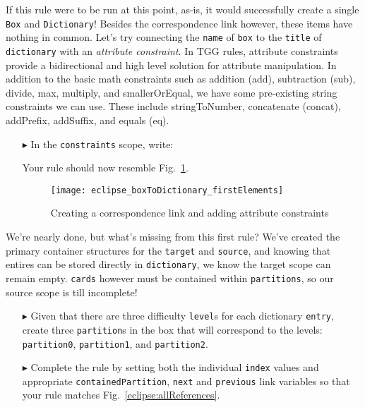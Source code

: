 If this rule were to be run at this point, as-is, it would successfully create a single \texttt{Box} and \texttt{Dictionary}! Besides the correspondence link
however, these items have nothing in common. Let's try connecting the \texttt{name} of \texttt{box} to the \texttt{title} of \texttt{dictionary} with an
\emph{attribute constraint}. In TGG rules, attribute constraints provide a bidirectional and high level solution for attribute manipulation. In addition to the
basic math constraints such as addition (add), subtraction (sub), divide, max, multiply, and smallerOrEqual, we have some pre-existing string constraints we can
use. These include stringToNumber, concatenate (concat), addPrefix, addSuffix, and equals (eq).

\begin{itemize}

\item[$\blacktriangleright$] In the \texttt{constraints} scope, write:


Your rule should now resemble Fig.~\ref{eclipse:ruleBasic}.

\vspace{0.5cm}

\begin{figure}[htbp]
\begin{center}
  \texttt{[image: eclipse\_boxToDictionary\_firstElements]}
  \caption{Creating a correspondence link and adding attribute constraints}
  \label{eclipse:ruleBasic}
\end{center}
\end{figure}

\end{itemize}

We're nearly done, but what's missing from this first rule? We've created the primary container structures for the \texttt{target} and \texttt{source}, and
knowing that entires can be stored directly in \texttt{dictionary}, we know the target scope can remain empty. \texttt{cards} however must be contained within
\texttt{partitions}, so our source scope is till incomplete!

\begin{itemize}

\item[$\blacktriangleright$] Given that there are three difficulty \texttt{level}s for each dictionary \texttt{entry}, create three \texttt{partition}s in the
box that will correspond to the levels: \texttt{partition0}, \texttt{partition1}, and \texttt{partition2}. 

\vspace{0.5cm}

\item[$\blacktriangleright$] Complete the rule by setting both the individual \texttt{index} values and appropriate \texttt{containedPartition},
\texttt{next} and \texttt{previous} link variables so that your rule matches Fig.~\ref{eclipse:allReferences}.

\end{itemize}

